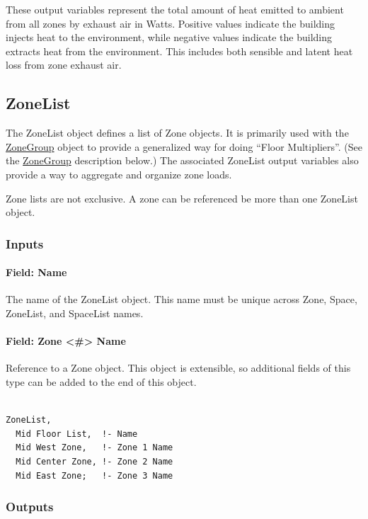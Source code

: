 These output variables represent the total amount of heat emitted to ambient from all zones by exhaust air in Watts. Positive values indicate the building injects heat to the environment, while negative values indicate the building extracts heat from the environment. This includes both sensible and latent heat loss from zone exhaust air.

\subsection{ZoneList}\label{zonelist}

The ZoneList object defines a list of Zone objects. It is primarily used with the \hyperref[zonegroup]{ZoneGroup} object to provide a generalized way for doing ``Floor Multipliers''. (See the \hyperref[zonegroup]{ZoneGroup} description below.) The associated ZoneList output variables also provide a way to aggregate and organize zone loads.

Zone lists are not exclusive. A zone can be referenced be more than one ZoneList object.

\subsubsection{Inputs}\label{inputs-1-045}

\paragraph{Field: Name}\label{field-zone-list-name-000}

The name of the ZoneList object. This name must be unique across Zone, Space, ZoneList, and SpaceList names.

\paragraph{Field: Zone \textless{}\#\textgreater{} Name}\label{field-zone-1---zone-20-name}

Reference to a Zone object. This object is extensible, so additional fields of this type can be added to the end of this object.

\begin{lstlisting}

ZoneList,
  Mid Floor List,  !- Name
  Mid West Zone,   !- Zone 1 Name
  Mid Center Zone, !- Zone 2 Name
  Mid East Zone;   !- Zone 3 Name
\end{lstlisting}

\subsubsection{Outputs}\label{outputs-1-028}

